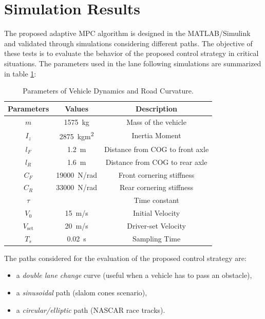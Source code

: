 \section{Simulation Results}
The proposed adaptive MPC algorithm is designed in the MATLAB/Simulink and validated through simulations considering different paths. The objective of these tests is to evaluate the behavior of the proposed control strategy in critical situations. The parameters used in the lane following simulations are summarized in table \ref{tab:params}:
\begin{table}[!h]
	\centering
	\begin{tabular}{|c|c|c|}
		\hline
		\bfseries Parameters          & \bfseries Values   & \bfseries Description   \\
		\hline
		$m$          & \SI{1575}{kg}  & Mass of the vehicle            \\
		$I_z$         & \SI{2875}{kgm^2}   & Inertia Moment            \\
		$l_F$           & \SI{1.2}{m}     & Distance from COG to front axle         \\
		$l_R$         & \SI{1.6}{m}    & Distance from COG to rear axle           \\
		$C_F$          & \SI{19000}{\newton/rad}&Front cornering stiffness      \\
		$C_R$           & \SI{33000}{\newton/rad}&Rear cornering stiffness  \\
		$\tau$             & \SI{0.2}    & Time constant            \\
		$V_0$           & \SI{15}{m/s} & Initial Velocity      \\
		$V_{\text{set}}$          & \SI{20}{m/s} & Driver-set Velocity  \\
		$T_s$         & \SI{0.02}{s} & Sampling Time
		         \\
		\hline
	\end{tabular}
	\caption{Parameters of Vehicle Dynamics and Road Curvature.}
	\label{tab:params}
\end{table}

The paths considered for the evaluation of the proposed control strategy are:
\begin{itemize}
	\item a \textit{double lane change} curve (useful when a vehicle has to pass an obstacle), 
	\item a \textit{sinusoidal} path (slalom cones scenario),
	\item a \textit{circular/elliptic} path (NASCAR race tracks).
\end{itemize} 

